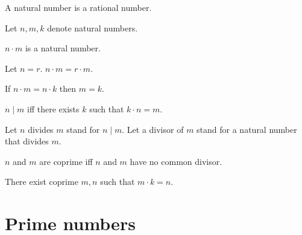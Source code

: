 \documentclass{article}
\begin{document}
  \begin{forthel}
    \begin{signature}
      A natural number is a rational number.
    \end{signature}

    Let $n,m,k$ denote natural numbers.

    \begin{signature}
      $n \cdot m$ is a natural number.
    \end{signature}

    \begin{axiom}
      Let $n = r$. $n \cdot m = r \cdot m$.
    \end{axiom}

    \begin{axiom}
      If $n \cdot m = n \cdot k$ then $m = k$.
    \end{axiom}

    \begin{definition}
      $n \mid m$ iff there exists $k$ such that $k \cdot n = m$.
    \end{definition}

    Let $n$ divides $m$ stand for $n \mid m$. Let a divisor of $m$ stand for a natural number that divides $m$.

    \begin{definition}
      $n$ and $m$ are coprime iff $n$ and $m$ have no common divisor.
    \end{definition}

    \begin{axiom}
      There exist coprime $m,n$ such that $m \cdot k = n$.
    \end{axiom}
  \end{forthel}

  \section*{Prime numbers}
\end{document}
